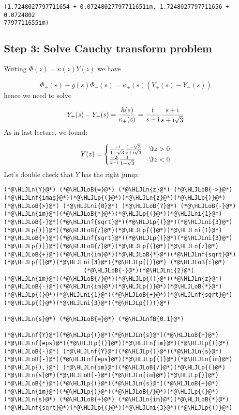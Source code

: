 \documentclass[12pt,landscape]{article}
\newcommand{\HLJLn}[1]{#1}
\newcommand{\HLJLnf}[1]{\textcolor[RGB]{66,102,213}{#1}}
\newcommand{\HLJLnfB}[1]{\textcolor[RGB]{59,151,46}{#1}}
\newcommand{\HLJLni}[1]{\textcolor[RGB]{59,151,46}{#1}}
\newcommand{\HLJLoB}[1]{\textcolor[RGB]{102,102,102}{\textbf{#1}}}
\newcommand{\HLJLp}[1]{#1}
\def\I{ {\rm i} }
\begin{document}
{\begin{lstlisting}
(1.7248027797711654 + 0.07248027797711651im, 1.7248027797711656 + 0.0724802
7797711655im)
\end{lstlisting}


\subsection{Step 3: Solve Cauchy transform problem}
Writing $\Phi(z) = \kappa(z) Y(z)$ we have

\[
\Phi_+(s) - g(s) \Phi_-(s) = \kappa_+(s) (Y_+(s) - Y_-(s))
\]
hence we need to solve

\[
Y_+(s) - Y_-(s) = {h(s) \over \kappa_+(s)} = {\I \over s- \I} {s + \I \over s+ \I \sqrt{3}}
\]
As in last lecture, we found:

\[
Y(z) = \begin{cases}
{-\I \over 1+\sqrt 3} {1-\sqrt 3 \over z+ \I \sqrt{3}} & \Im z > 0 \\
{-2 \I \over z-\I}{1 \over 1+ \sqrt{3}} & \Im z < 0
\end{cases}
\]
Let's double check that $Y$ has the right jump:


\begin{lstlisting}
(*@\HLJLn{Y}@*) (*@\HLJLoB{=}@*) (*@\HLJLn{z}@*) (*@\HLJLoB{->}@*) (*@\HLJLnf{imag}@*)(*@\HLJLp{(}@*)(*@\HLJLn{z}@*)(*@\HLJLp{)}@*) (*@\HLJLoB{>}@*) (*@\HLJLni{0}@*) (*@\HLJLoB{?}@*) (*@\HLJLoB{-}@*)(*@\HLJLn{im}@*)(*@\HLJLoB{*}@*)(*@\HLJLp{(}@*)(*@\HLJLni{1}@*)(*@\HLJLoB{-}@*)(*@\HLJLnf{sqrt}@*)(*@\HLJLp{(}@*)(*@\HLJLni{3}@*)(*@\HLJLp{))}@*)(*@\HLJLoB{/}@*)(*@\HLJLp{(}@*)(*@\HLJLni{1}@*)(*@\HLJLoB{+}@*)(*@\HLJLnf{sqrt}@*)(*@\HLJLp{(}@*)(*@\HLJLni{3}@*)(*@\HLJLp{))}@*)(*@\HLJLoB{/}@*)(*@\HLJLp{(}@*)(*@\HLJLn{z}@*)(*@\HLJLoB{+}@*)(*@\HLJLn{im}@*)(*@\HLJLoB{*}@*)(*@\HLJLnf{sqrt}@*)(*@\HLJLp{(}@*)(*@\HLJLni{3}@*)(*@\HLJLp{))}@*) (*@\HLJLoB{:}@*)
                       (*@\HLJLoB{-}@*)(*@\HLJLni{2}@*)(*@\HLJLn{im}@*)(*@\HLJLoB{/}@*)(*@\HLJLp{((}@*)(*@\HLJLn{z}@*)(*@\HLJLoB{-}@*)(*@\HLJLn{im}@*)(*@\HLJLp{)}@*)(*@\HLJLoB{*}@*)(*@\HLJLp{(}@*)(*@\HLJLni{1}@*)(*@\HLJLoB{+}@*)(*@\HLJLnf{sqrt}@*)(*@\HLJLp{(}@*)(*@\HLJLni{3}@*)(*@\HLJLp{)))}@*)

(*@\HLJLn{s}@*) (*@\HLJLoB{=}@*) (*@\HLJLnfB{0.1}@*)

(*@\HLJLnf{Y}@*)(*@\HLJLp{(}@*)(*@\HLJLn{s}@*)(*@\HLJLoB{+}@*)(*@\HLJLnf{eps}@*)(*@\HLJLp{()}@*)(*@\HLJLn{im}@*)(*@\HLJLp{)}@*) (*@\HLJLoB{-}@*) (*@\HLJLnf{Y}@*)(*@\HLJLp{(}@*)(*@\HLJLn{s}@*)(*@\HLJLoB{-}@*)(*@\HLJLnf{eps}@*)(*@\HLJLp{()}@*)(*@\HLJLn{im}@*)(*@\HLJLp{),}@*) (*@\HLJLn{im}@*)(*@\HLJLoB{/}@*)(*@\HLJLp{(}@*)(*@\HLJLn{s}@*)(*@\HLJLoB{-}@*)(*@\HLJLn{im}@*)(*@\HLJLp{)}@*)(*@\HLJLoB{*}@*)(*@\HLJLp{(}@*)(*@\HLJLn{s}@*)(*@\HLJLoB{+}@*)(*@\HLJLn{im}@*)(*@\HLJLp{)}@*)(*@\HLJLoB{/}@*)(*@\HLJLp{(}@*)(*@\HLJLn{s}@*) (*@\HLJLoB{+}@*) (*@\HLJLn{im}@*)(*@\HLJLoB{*}@*)(*@\HLJLnf{sqrt}@*)(*@\HLJLp{(}@*)(*@\HLJLni{3}@*)(*@\HLJLp{))}@*)
\end{lstlisting}

}
\end{document}
